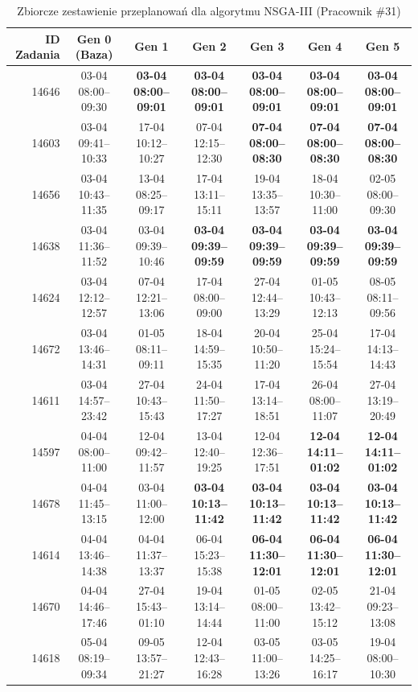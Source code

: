 \begin{table}[htbp]
\centering\scriptsize
\caption{Zbiorcze zestawienie przeplanowań dla algorytmu NSGA-III (Pracownik \#31)}
\label{tab:case_study_evolution_nsgaiii_u31}
\begin{tabular}{|r|c|c|c|c|c|c|}
\hline
\textbf{ID Zadania} & \textbf{Gen 0 (Baza)} & \textbf{Gen 1} & \textbf{Gen 2} & \textbf{Gen 3} & \textbf{Gen 4} & \textbf{Gen 5} \\ \hline
14646 & 03-04 08:00--09:30 & \textbf{03-04 08:00--09:01} & \textbf{03-04 08:00--09:01} & \textbf{03-04 08:00--09:01} & \textbf{03-04 08:00--09:01} & \textbf{03-04 08:00--09:01} \\ 
14603 & 03-04 09:41--10:33 & 17-04 10:12--10:27 & 07-04 12:15--12:30 & \textbf{07-04 08:00--08:30} & \textbf{07-04 08:00--08:30} & \textbf{07-04 08:00--08:30} \\ 
14656 & 03-04 10:43--11:35 & 13-04 08:25--09:17 & 17-04 13:11--15:11 & 19-04 13:35--13:57 & 18-04 10:30--11:00 & 02-05 08:00--09:30 \\ 
14638 & 03-04 11:36--11:52 & 03-04 09:39--10:46 & \textbf{03-04 09:39--09:59} & \textbf{03-04 09:39--09:59} & \textbf{03-04 09:39--09:59} & \textbf{03-04 09:39--09:59} \\ 
14624 & 03-04 12:12--12:57 & 07-04 12:21--13:06 & 17-04 08:00--09:00 & 27-04 12:44--13:29 & 01-05 10:43--12:13 & 08-05 08:11--09:56 \\ 
14672 & 03-04 13:46--14:31 & 01-05 08:11--09:11 & 18-04 14:59--15:35 & 20-04 10:50--11:20 & 25-04 15:24--15:54 & 17-04 14:13--14:43 \\ 
14611 & 03-04 14:57--23:42 & 27-04 10:43--15:43 & 24-04 11:50--17:27 & 17-04 13:14--18:51 & 26-04 08:00--11:07 & 27-04 13:19--20:49 \\ 
14597 & 04-04 08:00--11:00 & 12-04 09:42--11:57 & 13-04 12:40--19:25 & 12-04 12:36--17:51 & \textbf{12-04 14:11--01:02} & \textbf{12-04 14:11--01:02} \\ 
14678 & 04-04 11:45--13:15 & 03-04 11:00--12:00 & \textbf{03-04 10:13--11:42} & \textbf{03-04 10:13--11:42} & \textbf{03-04 10:13--11:42} & \textbf{03-04 10:13--11:42} \\ 
14614 & 04-04 13:46--14:38 & 04-04 11:37--13:37 & 06-04 15:23--15:38 & \textbf{06-04 11:30--12:01} & \textbf{06-04 11:30--12:01} & \textbf{06-04 11:30--12:01} \\ 
14670 & 04-04 14:46--17:46 & 27-04 15:43--01:10 & 19-04 13:14--14:44 & 01-05 08:00--11:00 & 02-05 13:42--15:12 & 21-04 09:23--13:08 \\ 
14618 & 05-04 08:19--09:34 & 09-05 13:57--21:27 & 12-04 12:43--16:28 & 03-05 11:00--13:26 & 03-05 14:25--16:17 & 19-04 08:00--10:30 \\ 

\end{tabular}
\end{table}
